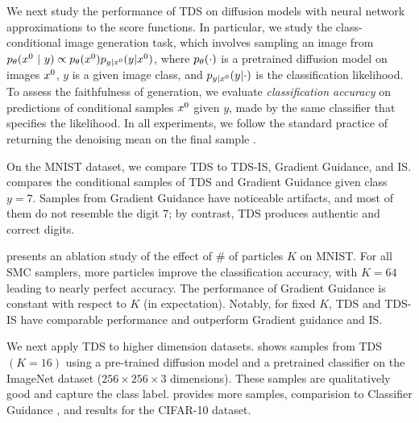 We next study the performance of TDS on diffusion models with neural network approximations to the score functions.
In particular, we study the class-conditional image generation task, which involves sampling an image from $p_{\theta}(x^{0} ~\vert~ y) \propto p_{\theta} (x^{0}) p_{y|x^{0}}({y}|{x^{0}})$, where $p_{\theta} (\cdot)$ is a pretrained diffusion model on images $x^{0}$, $y$ is a given image class, and $p_{y|x^{0}}({y}|{\cdot})$ is the classification likelihood. %
To assess the faithfulness of generation, we evaluate  \emph{classification accuracy} on predictions of conditional samples  $x^{0}$ given $y$, made by the same classifier that specifies the likelihood. 
In all experiments, we follow the standard practice of returning the denoising mean on the final sample \cite{ho2020denoising}.

On the MNIST dataset, we compare TDS to TDS-IS, Gradient Guidance, and IS. 
  compares the conditional samples of TDS and Gradient Guidance given class $y=7$.  
Samples from Gradient Guidance have noticeable artifacts, and most of them do not resemble the digit 7; by contrast, TDS produces authentic and correct digits.

 presents an ablation study of the effect of \# of particles $K$ on MNIST. For all SMC samplers,  more particles improve the classification accuracy,  with $K=64$ leading to nearly perfect accuracy. The performance of Gradient Guidance is constant with respect to $K$ (in expectation). Notably, for fixed $K$, TDS and TDS-IS have comparable performance and outperform Gradient guidance and IS. 

We next apply TDS to higher dimension datasets.   shows  samples from TDS $(K=16)$ using a pre-trained diffusion model  and a pretrained classifier on the ImageNet dataset ($256\times 256 \times 3$ dimensions). These samples are qualitatively good and capture the class label.  provides more samples, comparision to Classifier Guidance \citep{dhariwal2021diffusion}, and results for the CIFAR-10 dataset. 

